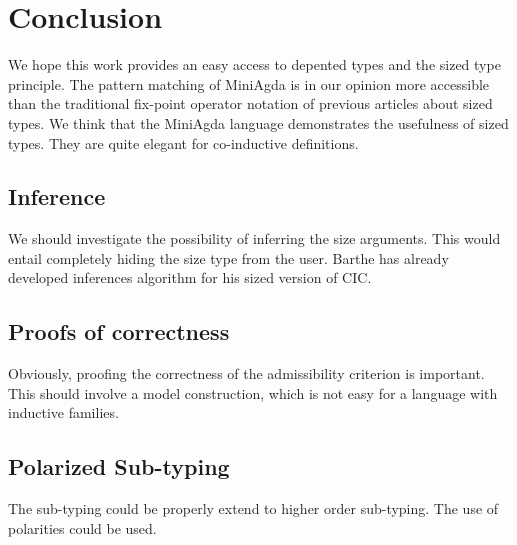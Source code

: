 \chapter{Conclusion}
We hope this work provides an easy access to depented types and the sized type principle.
The pattern matching of MiniAgda is in our opinion more accessible than the traditional fix-point operator
notation of previous articles about sized types.
We think that the MiniAgda language demonstrates the usefulness of sized types.
They are quite elegant for co-inductive definitions.
\section{Inference}
We should investigate the possibility of inferring the size arguments.
This would entail completely hiding the size type from the user.
Barthe has already developed inferences algorithm for his sized version of CIC.
\section{Proofs of correctness}
Obviously, proofing the correctness of the admissibility criterion is important.
This should involve a model construction, which is not easy for a language with inductive families.
\section{Polarized Sub-typing}
The sub-typing could be properly extend to higher order sub-typing.
The use of polarities could be used.
